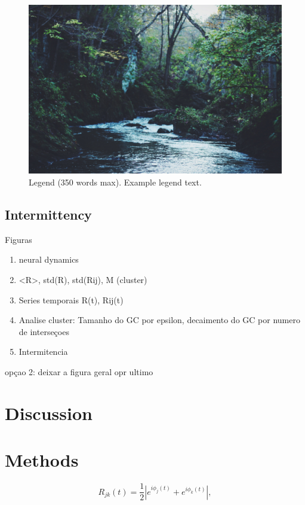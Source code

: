 \documentclass[fleqn,10pt]{wlscirep}
\begin{document}
\begin{figure}[ht]
\centering
\includegraphics[width=\linewidth]{stream}
\caption{Legend (350 words max). Example legend text.}
\label{fig:stream}
\end{figure}
\subsection*{Intermittency}


 Figuras
 \begin{enumerate}
    \item neural dynamics
     \item <R>, std(R), std(Rij), M (cluster) 
     \item Series temporais R(t), Rij(t)
     \item Analise cluster: Tamanho do GC por epsilon, decaimento do GC por numero de interseçoes 
     \item Intermitencia
 \end{enumerate}

opçao 2: deixar a figura geral opr ultimo


\section*{Discussion}











\section*{Methods}
\begin{equation}
    R_{jk}(t) = \frac{1}{2}\left| e^{i \phi_j(t)} + e^{i \phi_k(t)} \right|,
\end{equation}
\end{document}
